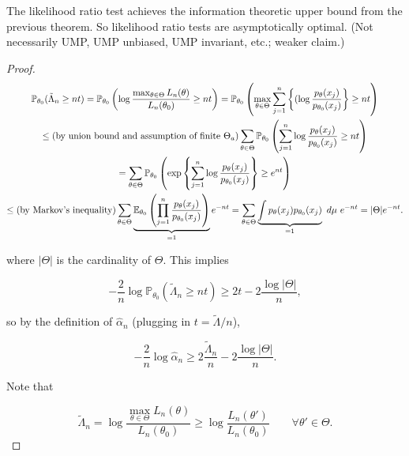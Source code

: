 \begin{remark}

The likelihood ratio test achieves the information theoretic upper bound from the previous theorem. So likelihood ratio tests are asymptotically optimal. (Not necessarily UMP, UMP unbiased, UMP invariant, etc.; weaker claim.)

\end{remark}


\begin{proof}

\begin{multline*}
\mathbb{P}_{\theta_0}( \tilde{\Lambda}_n \geq n t) =  \mathbb{P}_{\theta_0}\left( \log \frac{ \max_{\theta \in \Theta} L_n(\theta) }{L_n(\theta_0)} \geq n t \right)
=  \mathbb{P}_{\theta_0}\left(  \max_{\theta \in \Theta} \sum_{j=1}^n  \left\{ ( \log \frac{p_\theta(x_j) }{p_{\theta_0}(x_j)} \right\} \geq n t \right)
\\ \leq \text{(by union bound and assumption of finite } \Theta_a \text{)} \sum_{\theta \in \Theta} \mathbb{P}_{\theta_0}\left( \sum_{j=1}^n   \log \frac{p_\theta(x_j) }{p_{\theta_0}(x_j)}\geq n t \right)
\\ = \sum_{\theta \in \Theta} \mathbb{P}_{\theta_0}\left( \exp \left\{ \sum_{j=1}^n   \log \frac{p_\theta(x_j) }{p_{\theta_0}(x_j)} \right\} \geq e^{n t }\right)
\\ \leq \text{(by Markov's inequality)}    \sum_{\theta \in \Theta} \underbrace{\E_{\theta_0}\left( \prod_{j=1}^n     \frac{p_\theta(x_j) }{p_{\theta_0}(x_j)}  \right)}_{=1}  e^{-n t }
=   \sum_{\theta \in \Theta} \underbrace{\int p_\theta(x_j)  p_{\theta_0}(x_j)}  _{=1}  \ d\mu \ e^{-n t } = |\Theta| e^{-n t }.
\end{multline*}

where \(|\Theta|\) is the cardinality of \(\Theta\). This implies

\[
- \frac{2}{n} \log \mathbb{P}_{\theta_0}( \tilde{\Lambda}_n \geq n t)  \geq  2t - 2 \frac{\log |\Theta| }{n},
\]

so by the definition of \(\hat{\alpha}_n\) (plugging in \(t = \tilde{\Lambda}/n\)), 

\[
- \frac{2}{n} \log \hat{\alpha}_n  \geq  2 \frac{\tilde{\Lambda}_n}{n} - 2 \frac{\log |\Theta| }{n}.
\]

Note that

\[
\tilde{\Lambda}_n =  \log \frac{ \max_{\theta \in \Theta} L_n(\theta) }{L_n(\theta_0)} \geq \log \frac{  L_n(\theta') }{L_n(\theta_0)} \qquad \forall \theta' \in \Theta.
\]


\end{proof}
